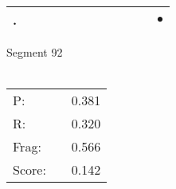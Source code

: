 \documentclass[landscape]{article}
\newcommand{\ssp}{\hspace{2pt}}
\newcommand{\mex}{\cellcolor{g}$\bullet$}
\begin{document}
\begin{tabular}{|l|p{10pt}|p{10pt}|p{10pt}|p{10pt}|p{10pt}|p{10pt}|p{10pt}|p{10pt}|p{10pt}|p{10pt}|p{10pt}|}
\hline
\ssp \cellcolor{ref10}. \ssp&\hspace{2pt}&\hspace{2pt}&\hspace{2pt}&\hspace{2pt}&\hspace{2pt}&\hspace{2pt}&\hspace{2pt}&\hspace{2pt}&\hspace{2pt}&\hspace{2pt}&\hspace{2pt}\mex\\
\hline
\end{tabular}

\vspace{6pt}
\noindent Segment 92\\\\
\noindent\begin{tabular}{lm{12pt}r}
\hline
P:&&0.381\\
R:&&0.320\\
Frag:&&0.566\\
Score:&&0.142\\
\end{tabular}

\newpage
\end{document}
